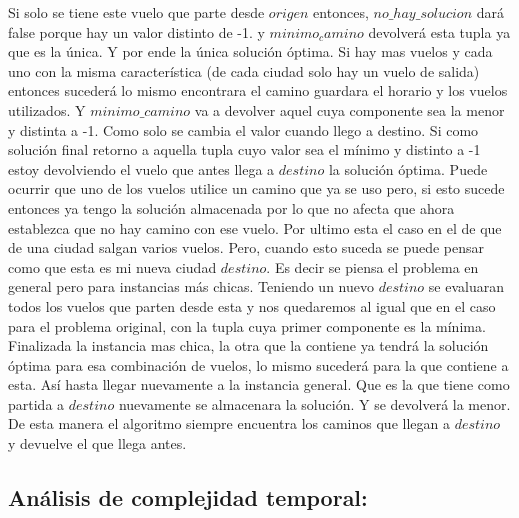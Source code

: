 \documentclass[a4paper]{article}
\begin{document}
Si solo se tiene este vuelo que parte desde $origen$ entonces, $no\_hay\_solucion$ dará false porque hay un valor distinto de -1. y $minimo_camino$ devolverá esta tupla ya que es la única. Y por ende la única solución óptima. Si hay mas vuelos y cada uno con la misma característica (de cada ciudad solo hay un vuelo de salida) entonces sucederá lo mismo encontrara el camino guardara el horario y   los vuelos utilizados. Y $minimo\_camino$ va a devolver aquel cuya componente sea la menor y distinta a -1. Como solo se cambia el valor cuando llego a destino. Si como solución final retorno a aquella tupla cuyo valor sea el mínimo y distinto a -1 estoy devolviendo el vuelo que antes llega a $destino$ la solución óptima. Puede ocurrir que uno de los vuelos utilice un camino que ya se uso pero, si esto sucede entonces ya tengo la solución almacenada por lo que no afecta que ahora establezca que no hay camino con ese vuelo.
Por ultimo esta el caso en el de que de una ciudad salgan varios vuelos. Pero, cuando esto suceda se puede pensar como que esta es mi nueva ciudad  $destino$. Es decir se piensa el problema en general pero para instancias más chicas. Teniendo un nuevo $destino$ se evaluaran todos los vuelos que parten desde esta y nos quedaremos al igual que en el caso para el problema original, con la tupla cuya primer componente es la mínima. Finalizada la instancia mas chica, la otra que la contiene ya tendrá la solución óptima para esa combinación de vuelos, lo mismo sucederá para la que contiene a esta. Así hasta llegar nuevamente a la instancia general. Que es la que tiene como partida a $destino$ nuevamente se almacenara la solución. Y se devolverá la menor. De esta manera el algoritmo siempre encuentra los caminos que llegan a $destino$ y devuelve el que llega antes.

\subsection{Análisis de complejidad temporal:}
\end{document}
